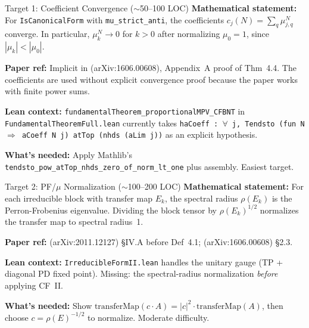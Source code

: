 \documentclass[aspectratio=169,10pt]{beamer}
\begin{document}
\begin{frame}{Target 1: Coefficient Convergence (\texorpdfstring{$\sim$50--100}{~50-100} LOC)}
    \textbf{Mathematical statement:}
    For \texttt{IsCanonicalForm} with \texttt{mu\_strict\_anti}, the coefficients
    $c_j(N) = \sum_q \mu_{j,q}^N$ converge. In particular, $\mu_k^N \to 0$ for $k > 0$
    after normalizing $\mu_0 = 1$, since $|\mu_k| < |\mu_0|$.

    \vspace{0.5em}
    \textbf{Paper ref:} Implicit in \cite{Cirac2017Annals} (arXiv:1606.00608), Appendix~A proof of Thm~4.4.
    The coefficients are used without explicit convergence proof because the paper works with finite power sums.

    \vspace{0.5em}
    \textbf{Lean context:}
    \texttt{fundamentalTheorem\_proportionalMPV\_CFBNT} in \texttt{FundamentalTheoremFull.lean} currently takes
    \texttt{haCoeff : $\forall$ j, Tendsto (fun N $\Rightarrow$ aCoeff N j) atTop (nhds (aLim j))} as an explicit hypothesis.

    \vspace{0.5em}
    \textbf{What's needed:} Apply Mathlib's \texttt{tendsto\_pow\_atTop\_nhds\_zero\_of\_norm\_lt\_one} plus assembly. \textcolor{leangreen}{Easiest target.}
\end{frame}

\begin{frame}{Target 2: PF/$\mu$ Normalization (\texorpdfstring{$\sim$100--200}{~100-200} LOC)}
    \textbf{Mathematical statement:}
    For each irreducible block with transfer map $E_k$, the spectral radius $\rho(E_k)$
    is the Perron-Frobenius eigenvalue. Dividing the block tensor by $\rho(E_k)^{1/2}$
    normalizes the transfer map to spectral radius~1.

    \vspace{0.5em}
    \textbf{Paper ref:} \cite{Cirac2021Matrix} (arXiv:2011.12127) \S IV.A before Def~4.1;
    \cite{Cirac2017Annals} (arXiv:1606.00608) \S 2.3.

    \vspace{0.5em}
    \textbf{Lean context:}
    \texttt{IrreducibleFormII.lean} handles the unitary gauge (TP + diagonal PD fixed point).
    Missing: the spectral-radius normalization \emph{before} applying CF~II.

    \vspace{0.5em}
    \textbf{What's needed:} Show $\text{transferMap}(c \cdot A) = |c|^2 \cdot \text{transferMap}(A)$,
    then choose $c = \rho(E)^{-1/2}$ to normalize. \textcolor{amber}{Moderate difficulty.}
\end{frame}
\end{document}
